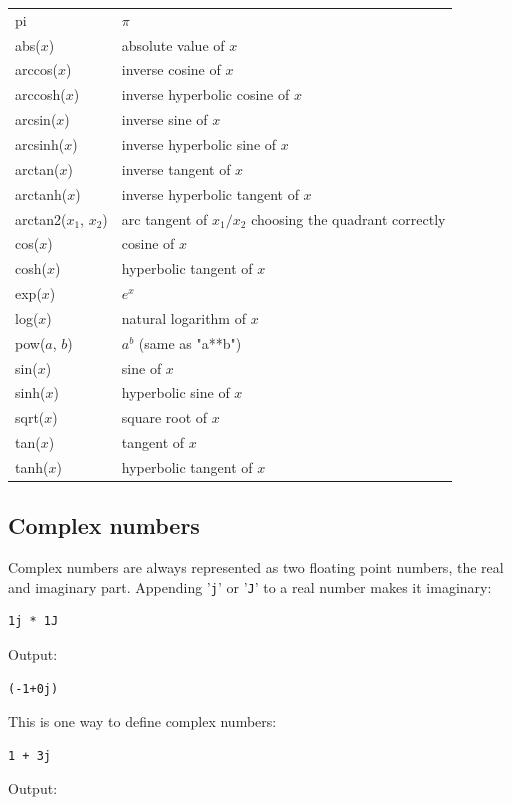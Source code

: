 \documentclass[article,A4,12pt]{llncs}
\begin{document}
\begin{center}
\begin{tabular}{|l|l|}
\hline
pi &  $\pi$\\
abs($x$) &  absolute value of $x$\\
arccos($x$) &  inverse cosine of $x$ \\
arccosh($x$) &  inverse hyperbolic cosine of $x$ \\
arcsin($x$) & inverse sine of $x$ \\
arcsinh($x$) & inverse hyperbolic sine of $x$ \\
arctan($x$) & inverse tangent of $x$ \\
arctanh($x$) & inverse hyperbolic tangent of $x$ \\
arctan2($x_1$, $x_2$) & arc tangent of $x_1/x_2$ choosing the quadrant correctly \\
cos($x$) & cosine of $x$ \\
cosh($x$) & hyperbolic tangent of $x$ \\
exp($x$) & $e^x$ \\
log($x$) & natural logarithm of $x$ \\
pow($a$, $b$) & $a^b$ (same as "a**b")\\
sin($x$) & sine of $x$ \\
sinh($x$) & hyperbolic sine of $x$ \\
sqrt($x$) & square root of $x$ \\
tan($x$) & tangent of $x$\\
tanh($x$) & hyperbolic tangent of $x$ \\
\hline
\end{tabular}
\end{center}
\vspace{4mm}
\noindent

\subsection{Complex numbers}
Complex numbers are always represented as two floating point numbers, the 
real and imaginary part. Appending '{\tt j}' or  '{\tt J}' to a real number
makes it imaginary:

\begin{verbatim}
1j * 1J
\end{verbatim}
Output:

\begin{verbatim}
(-1+0j)
\end{verbatim}
This is one way to define complex numbers:
\begin{verbatim}
1 + 3j
\end{verbatim}
Output:
\end{document}
